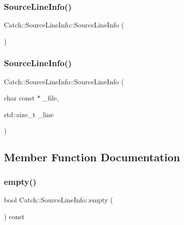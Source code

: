 \subsubsection{\texorpdfstring{Source\+Line\+Info()}{SourceLineInfo()}\hspace{0.1cm}{\footnotesize\ttfamily [1/2]}}
{\footnotesize\ttfamily Catch\+::\+Source\+Line\+Info\+::\+Source\+Line\+Info (\begin{DoxyParamCaption}{ }\end{DoxyParamCaption})}

\mbox{\label{struct_catch_1_1_source_line_info_a6218cb890337d37f708ea94063958940}} 
\subsubsection{\texorpdfstring{Source\+Line\+Info()}{SourceLineInfo()}\hspace{0.1cm}{\footnotesize\ttfamily [2/2]}}
{\footnotesize\ttfamily Catch\+::\+Source\+Line\+Info\+::\+Source\+Line\+Info (\begin{DoxyParamCaption}\item[{char const $\ast$}]{\+\_\+file,  }\item[{std\+::size\+\_\+t}]{\+\_\+line }\end{DoxyParamCaption})}



\subsection{Member Function Documentation}
\mbox{\label{struct_catch_1_1_source_line_info_a05ab6444e9de7e9c3e76d8aa00093c3a}} 
\subsubsection{\texorpdfstring{empty()}{empty()}}
{\footnotesize\ttfamily bool Catch\+::\+Source\+Line\+Info\+::empty (\begin{DoxyParamCaption}{ }\end{DoxyParamCaption}) const}

